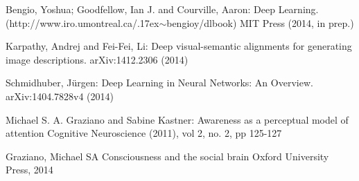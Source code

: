 \documentclass[citeauthoryear]{llncs}
\begin{document}
%
%
\begin{thebibliography}{}
%
\newcommand{\mytilde}{\raise.17ex\hbox{$\scriptstyle\mathtt{\sim}$}}


Bengio, Yoshua; Goodfellow, Ian J. and Courville, Aaron:
Deep Learning.
(http://www.iro.umontreal.ca/\mytilde{}bengioy/dlbook)
MIT Press (2014, in prep.)







Karpathy, Andrej and Fei-Fei, Li:
Deep visual-semantic alignments for generating image descriptions.
arXiv:1412.2306 (2014)


Schmidhuber, J{\"u}rgen:
Deep Learning in Neural Networks: An Overview.
arXiv:1404.7828v4 (2014)


Michael S. A.   Graziano  and  Sabine   Kastner:
Awareness as a perceptual model of attention
Cognitive Neuroscience (2011), vol 2, no. 2, pp 125-127


Graziano, Michael SA
Consciousness and the social brain
Oxford University Press, 2014

\end{thebibliography}
\end{document}
